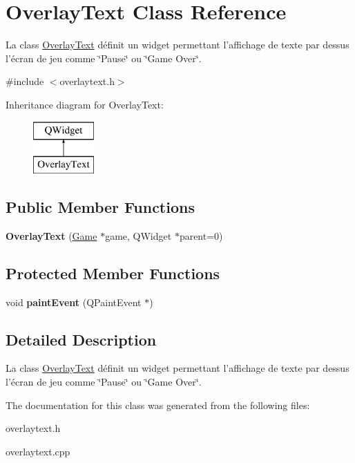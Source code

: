 \hypertarget{classOverlayText}{\section{Overlay\-Text Class Reference}
\label{classOverlayText}
}


La class \hyperlink{classOverlayText}{Overlay\-Text} définit un widget permettant l'affichage de texte par dessus l'écran de jeu comme \char`\"{}\-Pause\char`\"{} ou \char`\"{}\-Game Over\char`\"{}.  




{\ttfamily \#include $<$overlaytext.\-h$>$}

Inheritance diagram for Overlay\-Text\-:\begin{figure}[H]
\begin{center}
\leavevmode
\includegraphics[height=2.000000cm]{classOverlayText}
\end{center}
\end{figure}
\subsection*{Public Member Functions}
\begin{DoxyCompactItemize}
\item 
\hypertarget{classOverlayText_a23f5d7cb173c3ea9b22756891ba055f5}{{\bfseries Overlay\-Text} (\hyperlink{classGame}{Game} $\ast$game, Q\-Widget $\ast$parent=0)}\label{classOverlayText_a23f5d7cb173c3ea9b22756891ba055f5}

\end{DoxyCompactItemize}
\subsection*{Protected Member Functions}
\begin{DoxyCompactItemize}
\item 
\hypertarget{classOverlayText_a7e395d2f1a573e7dbba3fb1676d583a1}{void {\bfseries paint\-Event} (Q\-Paint\-Event $\ast$)}\label{classOverlayText_a7e395d2f1a573e7dbba3fb1676d583a1}

\end{DoxyCompactItemize}


\subsection{Detailed Description}
La class \hyperlink{classOverlayText}{Overlay\-Text} définit un widget permettant l'affichage de texte par dessus l'écran de jeu comme \char`\"{}\-Pause\char`\"{} ou \char`\"{}\-Game Over\char`\"{}. 

The documentation for this class was generated from the following files\-:\begin{DoxyCompactItemize}
\item 
overlaytext.\-h\item 
overlaytext.\-cpp\end{DoxyCompactItemize}
